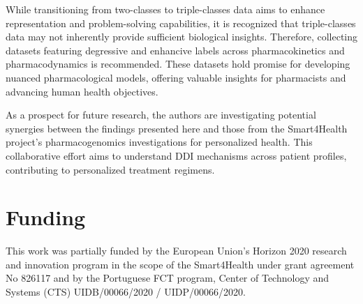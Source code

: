 \documentclass[unnumsec,webpdf,contemporary,large]{oup-authoring-template}%
\theoremstyle{thmstyleone}%
\theoremstyle{thmstyletwo}%
\theoremstyle{thmstylethree}%
\begin{document}
While transitioning from two-classes to triple-classes data aims to enhance representation and problem-solving capabilities, it is recognized that triple-classes data may not inherently provide sufficient biological insights. Therefore, collecting datasets featuring degressive and enhancive labels across pharmacokinetics and pharmacodynamics is recommended. These datasets hold promise for developing nuanced pharmacological models, offering valuable insights for pharmacists and advancing human health objectives.

As a prospect for future research, the authors are investigating potential synergies between the findings presented here and those from the Smart4Health project’s pharmacogenomics investigations for personalized health. This collaborative effort aims to understand DDI mechanisms across patient profiles, contributing to personalized treatment regimens.
\section{Funding}
This work was partially funded by the European Union’s Horizon 2020 research and innovation program in the scope of the Smart4Health under grant agreement No 826117 and by the Portuguese FCT program, Center of Technology and Systems (CTS) UIDB/00066/2020 / UIDP/00066/2020.
\end{document}
